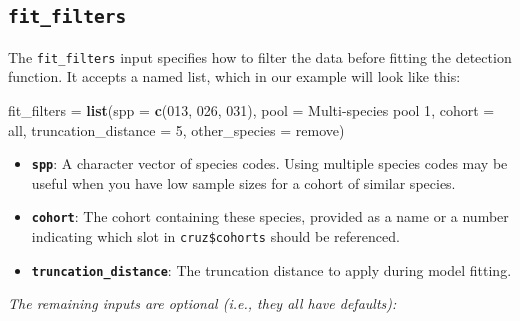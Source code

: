 \documentclass[
]{book}
\newenvironment{Shaded}{\begin{snugshade}}{\end{snugshade}}
\newcommand{\AttributeTok}[1]{\textcolor[rgb]{0.13,0.29,0.53}{#1}}
\newcommand{\DecValTok}[1]{\textcolor[rgb]{0.00,0.00,0.81}{#1}}
\newcommand{\FunctionTok}[1]{\textcolor[rgb]{0.13,0.29,0.53}{\textbf{#1}}}
\newcommand{\NormalTok}[1]{#1}
\newcommand{\OtherTok}[1]{\textcolor[rgb]{0.56,0.35,0.01}{#1}}
\newcommand{\StringTok}[1]{\textcolor[rgb]{0.31,0.60,0.02}{#1}}
\begin{document}
\hypertarget{fit_filters}{%
\subsection*{\texorpdfstring{\texttt{fit\_filters}}{fit\_filters}}\label{fit_filters}}

The \texttt{fit\_filters} input specifies how to filter the data before fitting the detection function. It accepts a named list, which in our example will look like this:

\begin{Shaded}
\begin{Highlighting}[]
\NormalTok{fit\_filters }\OtherTok{=} \FunctionTok{list}\NormalTok{(}\AttributeTok{spp =} \FunctionTok{c}\NormalTok{(}\StringTok{\textquotesingle{}013\textquotesingle{}}\NormalTok{, }\StringTok{\textquotesingle{}026\textquotesingle{}}\NormalTok{, }\StringTok{\textquotesingle{}031\textquotesingle{}}\NormalTok{), }
                   \AttributeTok{pool =} \StringTok{\textquotesingle{}Multi{-}species pool 1\textquotesingle{}}\NormalTok{,}
                   \AttributeTok{cohort =} \StringTok{\textquotesingle{}all\textquotesingle{}}\NormalTok{,}
                   \AttributeTok{truncation\_distance =} \DecValTok{5}\NormalTok{,}
                   \AttributeTok{other\_species =} \StringTok{\textquotesingle{}remove\textquotesingle{}}\NormalTok{)}
\end{Highlighting}
\end{Shaded}

\begin{itemize}
\item
  \textbf{\texttt{spp}}: A character vector of species codes. Using multiple species codes may be useful when you have low sample sizes for a cohort of similar species.
\item
  \textbf{\texttt{cohort}}: The cohort containing these species, provided as a name or a number indicating which slot in \texttt{cruz\$cohorts} should be referenced.
\item
  \textbf{\texttt{truncation\_distance}}: The truncation distance to apply during model fitting.
\end{itemize}

\emph{The remaining inputs are optional (i.e., they all have defaults):}
\end{document}
